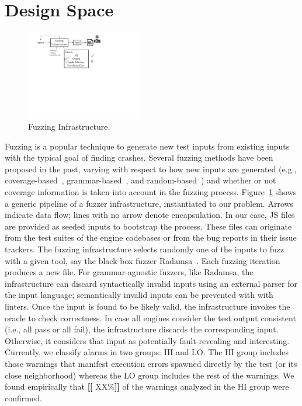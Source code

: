 \documentclass[11pt]{article}
\newcommand{\ie}{i.e.}
\newcommand{\eg}{e.g.}
\newcommand{\Fix}[1]{\textbf{[[}{\color{red} #1}\textbf{]]}}
\begin{document}
\section{Design Space}
\label{sec:design}

\begin{figure}
  \vspace{-5ex}
  \centering
  \includegraphics[trim=20 350 200 0,clip,width=0.45\textwidth]{google-awards-workflow}
  \caption{\label{fig:workflow}Fuzzing Infrastructure.}
  \vspace{-5ex}  
\end{figure}
Fuzzing is a popular technique to generate new test inputs from
existing inputs~\cite{fuzz-testing-history} with the typical goal of
finding crashes. Several fuzzing methods have been proposed in the
past, varying with respect to how new inputs are generated (\eg{},
coverage-based~\cite{afl,honggfuzz},
grammar-based~\cite{grammarinator,jsfunfuzz}, and
random-based~\cite{radamsa}) and whether or not coverage information
is taken into account in the fuzzing
process. Figure~\ref{fig:workflow} shows a generic pipeline of a
fuzzer infrastructure, instantiated to our problem. Arrows indicate data flow; lines
with no arrow denote encapsulation. In our case, JS files are
provided as seeded inputs to bootstrap the process. These files can
originate from the test suites of the engine codebases or from the bug
reports in their issue trackers. The fuzzing infrastructure selects
randomly one of the inputs to fuzz with a given tool, say the
black-box fuzzer Radamsa~\cite{radamsa}. Each fuzzing iteration
produces a new file. For grammar-agnostic fuzzers, like Radamsa, the
infrastructure can discard syntactically invalid
inputs using an external parser for the input language; semantically
invalid inputs can be prevented with with linters. Once the input is
found to be likely valid, the infrastructure
invokes the oracle to check correctness. In case all engines
consider the test output consistent (\ie{}, all pass or all fail), the
infrastructure discards the corresponding input. Otherwise, it considers that
input as potentially fault-revealing and interesting. Currently, we
classify alarms in two groups: HI and LO. The HI group includes
those warnings that manifest execution errors spawned directly by the
test (or its close neighborhood) whereas the LO group includes the
rest of the warnings. We found empirically that \Fix{XX\%} of the
warnings analyzed in the HI group were confirmed.
\end{document}
